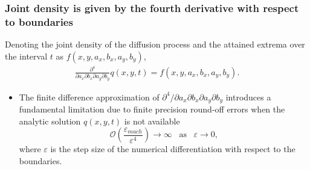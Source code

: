 \documentclass{beamer}
\begin{document}
\begin{frame}
  \frametitle{Joint density is given by the fourth derivative with respect to boundaries}
  Denoting the joint density of the diffusion process and the attained extrema over the interval $t$ as
  $f(x,y,a_x,b_x,a_y,b_y)$,
  \begin{align*}
  \frac{\partial^4}{\partial a_x \partial b_x \partial a_y \partial b_y} q(x,y,t) = f(x,y,a_x,b_x,a_y,b_y).
  \end{align*}

  \begin{itemize}
  \item The finite difference approximation of
    $\partial^4/\partial a_x \partial b_x \partial a_y \partial b_y$
    introduces a fundamental limitation due to finite precision
    round-off errors when the analytic solution $q(x,y,t)$ is not available
    \[
      \mathcal{O}\left(\frac{\varepsilon_{mach}}{\varepsilon^4} \right) \to \infty \,\,\, \mbox{ as } \,\,\, \varepsilon \to 0,
    \]
    where $\varepsilon$ is the step size of the numerical differentiation with respect to the boundaries.
  \end{itemize}
\end{frame}
\end{document}
